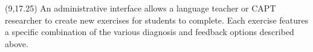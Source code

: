 \documentclass[a0,portrait]{a0poster}
\def\bannercolor{BannerSixColor}
\newcommand{\headingcolor}{\color{BannerSixColor}}
\newcommand{\titlecolor}{\color{TitleColor}}
\newcommand{\banner}{\LARGE \tikz{\path[draw=\bannercolor,fill=\bannercolor] (0,0) rectangle (\linewidth,2.25em);}}
\def\Highlight#1{{\sffamily \headingcolor #1}}
\let\Textsize\Large
\def\LHead#1{\noindent{\sffamily \LARGE \headingcolor #1}\smallskip}
\begin{document}
 \begin{textblock}{2.35}(9,17.25)
   \Textsize
  An administrative interface allows a language teacher or CAPT researcher to  create new exercises for students to complete. Each exercise features a specific combination of the various diagnosis and feedback options described above. %
  
  
 
 
% 

%  
  
\end{textblock}


% 
\end{document}
